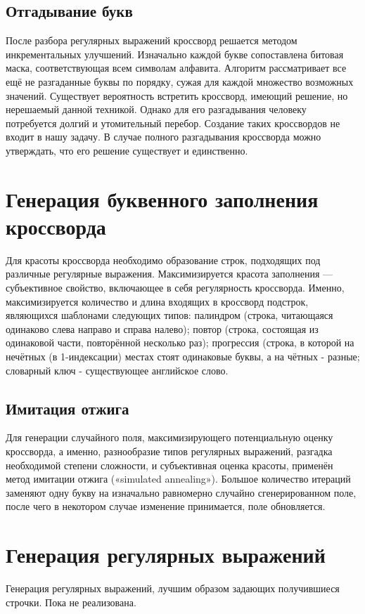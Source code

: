 \documentclass[12pt]{report}
\begin{document}
\subsection{Отгадывание букв} После разбора регулярных выражений кроссворд решается методом инкрементальных улучшений. Изначально каждой букве сопоставлена битовая маска, соответствующая всем символам алфавита. Алгоритм рассматривает все ещё не разгаданные буквы по порядку, сужая для каждой множество возможных значений. Существует вероятность встретить кроссворд, имеющий решение, но нерешаемый данной техникой. Однако для его разгадывания человеку потребуется долгий и утомительный перебор. Создание таких кроссвордов не входит в нашу задачу. В случае полного разгадывания кроссворда можно утверждать, что его решение существует и единственно.

\section{Генерация буквенного заполнения кроссворда} Для красоты кроссворда необходимо образование строк, подходящих под различные регулярные выражения. Максимизируется красота заполнения — субъективное свойство, включающее в себя регулярность кроссворда. Именно, максимизируется количество и длина входящих в кроссворд подстрок, являющихся шаблонами следующих типов: палиндром (строка, читающаяся одинаково слева направо и справа налево); повтор (строка, состоящая из одинаковой части, повторённой несколько раз); прогрессия (строка, в которой на нечётных (в 1-индексации) местах стоят одинаковые буквы, а на чётных - разные; словарный ключ - существующее английское слово.
\subsection{Имитация отжига} Для генерации случайного поля, максимизирующего потенциальную оценку кроссворда, а именно, разнообразие типов регулярных выражений, разгадка необходимой степени сложности, и субъективная оценка красоты, применён метод имитации отжига («simulated annealing»). Большое количество итераций заменяют одну букву на изначально равномерно случайно сгенерированном поле, после чего в некотором случае изменение принимается, поле обновляется.


\section{Генерация регулярных выражений} Генерация регулярных выражений, лучшим образом задающих получившиеся строчки. Пока не реализована.
\end{document}
